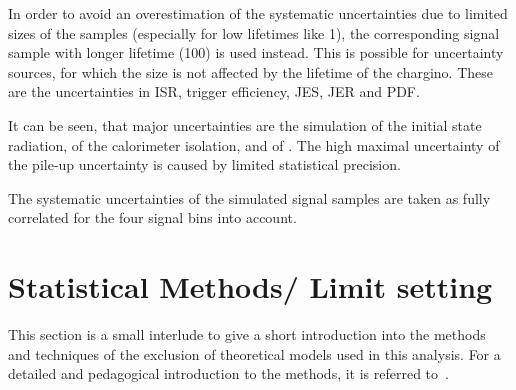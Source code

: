 In order to avoid an overestimation of the systematic uncertainties due to limited sizes of the samples (especially for low lifetimes like 1\cm), the corresponding signal sample with longer lifetime (100\cm) is used instead.
This is possible for uncertainty sources, for which the size is not affected by the lifetime of the chargino.
These are the uncertainties in ISR, trigger efficiency, JES, JER and PDF.

It can be seen, that major uncertainties are the simulation of the initial state radiation, of the calorimeter isolation, and of \ias.
The high maximal uncertainty of the pile-up uncertainty is caused by limited statistical precision.

The systematic uncertainties of the simulated signal samples are taken as fully correlated for the four signal bins into account.

\section{Statistical Methods/ Limit setting}
This section is a small interlude to give a short introduction into the methods and techniques of the exclusion of theoretical models used in this analysis.
For a detailed and pedagogical introduction to the methods, it is referred to~\cite{bib:Ott_Thesis}.

